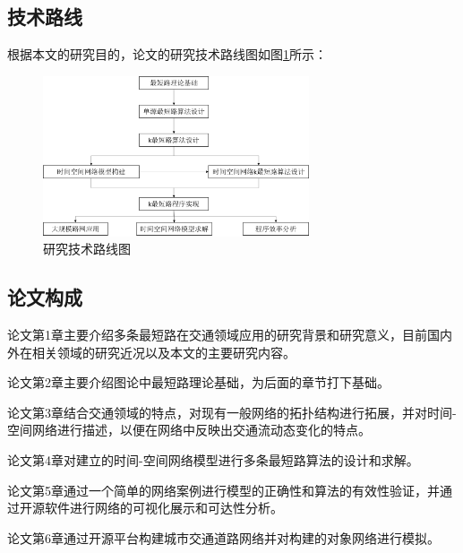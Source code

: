 \subsection{技术路线}\label{subsec:技术路线}
根据本文的研究目的，论文的研究技术路线图如图\ref{fig:fig1}所示：
\begin{figure}[H] %
    \centering %
    \includegraphics[width=0.7\textwidth]{png/图片1 研究技术路线图} %
    \caption{研究技术路线图} %
    \label{fig:fig1} %
\end{figure}

\subsection{论文构成}\label{subsec:论文构成}
论文第1章主要介绍多条最短路在交通领域应用的研究背景和研究意义，目前国内外在相关领域的研究近况以及本文的主要研究内容。


论文第2章主要介绍图论中最短路理论基础，为后面的章节打下基础。


论文第3章结合交通领域的特点，对现有一般网络的拓扑结构进行拓展，并对时间-空间网络进行描述，以便在网络中反映出交通流动态变化的特点。


论文第4章对建立的时间-空间网络模型进行多条最短路算法的设计和求解。


论文第5章通过一个简单的网络案例进行模型的正确性和算法的有效性验证，并通过开源软件进行网络的可视化展示和可达性分析。


论文第6章通过开源平台构建城市交通道路网络并对构建的对象网络进行模拟。

